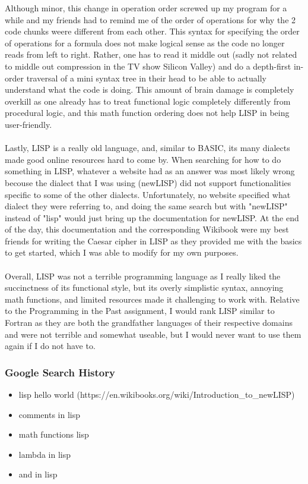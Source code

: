 \documentclass[letterpaper, 10pt, DIV=13]{scrartcl}
\numberwithin{equation}{section}
\numberwithin{figure}{section}
\numberwithin{table}{section}
\begin{document}
Although minor, this change in operation order screwed up my program for a while and my friends had to remind me of the order of operations for why the 2 
code chunks weere different from each other. This syntax for specifying the order of operations for a formula does not make logical sense as the code no 
longer reads from left to right. Rather, one has to read it middle out (sadly not related to middle out compression in the TV show Silicon Valley) and do a depth-first
in-order traversal of a mini syntax tree in their head to be able to actually understand what the code is doing. This amount of brain damage is completely overkill as
one already has to treat functional logic completely differently from procedural logic, and this math function ordering does not help LISP in being user-friendly.
\\ \\
Lastly, LISP is a really old language, and, similar to BASIC, its many dialects made good online resources hard to come by. When searching for how to do something in LISP, 
whatever a website had as an answer was most likely wrong becouse the dialect that I was using (newLISP) did not support functionalities specific to some of the 
other dialects. Unfortunately, no website specified what dialect they were referring to, and doing the same search but with "newLISP" instead of "lisp" would 
just bring up the documentation for newLISP. At the end of the day, this documentation and the corresponding Wikibook were my best friends for writing the Caesar cipher
in LISP as they provided me with the basics to get started, which I was able to modify for my own purposes.
\\ \\
Overall, LISP was not a terrible programming language as I really liked the succinctness of its functional style, but its overly simplistic syntax, annoying math 
functions, and limited resources made it challenging to work with. Relative to the Programming in the Past assignment, I would rank LISP similar to Fortran as they are 
both the grandfather languages of their respective domains and were not terrible and somewhat useable, but I would never want to use them again if I do not have to.

\subsubsection{Google Search History}
\begin{itemize}
    \item lisp hello world (https://en.wikibooks.org/wiki/Introduction\_to\_newLISP)
    \item comments in lisp
    \item math functions lisp
    \item lambda in lisp
    \item and in lisp
\end{itemize}
\end{document}
